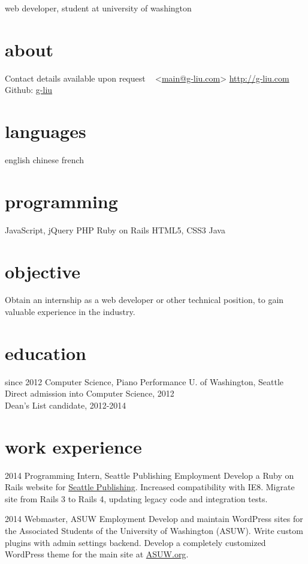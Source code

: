 \documentclass[]{friggeri-cv}
\begin{document}
       {web developer, student at university of washington}

\begin{aside}
  \section{about}
    Contact details available upon request
    ~
    <\href{mailto:main@g-liu.com}{main@g-liu.com}>
    \href{http://g-liu.com}{http://g-liu.com}
    Github: \href{http://github.com/g-liu}{g-liu}
  \section{languages}
    english
    chinese
    french
  \section{programming}
  	JavaScript, jQuery
  	PHP
  	Ruby on Rails
    HTML5, CSS3
    Java
\end{aside}

\section{objective}

Obtain an internship as a web developer or other technical position, to gain valuable experience in the industry.

\section{education}

\begin{entrylist}
  \entry
    {since 2012}
    {Computer Science, Piano Performance}
    {U. of Washington, Seattle}
    {Direct admission into Computer Science, 2012 \\
    Dean's List candidate, 2012-2014}
\end{entrylist}

\section{work experience}

\begin{entrylist}
  \entry 
    {2014}
    {Programming Intern, Seattle Publishing}
    {Employment}
    {Develop a Ruby on Rails website for \href{http://seattlepublishing.com}{Seattle Publishing}. Increased compatibility with IE8. Migrate site from Rails 3 to Rails 4, updating legacy code and integration tests.}
  
  \entry
    {2014}
    {Webmaster, ASUW}
    {Employment}
    {Develop and maintain WordPress sites for the Associated Students of the University of Washington (ASUW). Write custom plugins with admin settings backend. Develop a completely customized WordPress theme for the main site at \href{http://asuw.org}{ASUW.org}.}
    
\end{entrylist}
\end{document}
